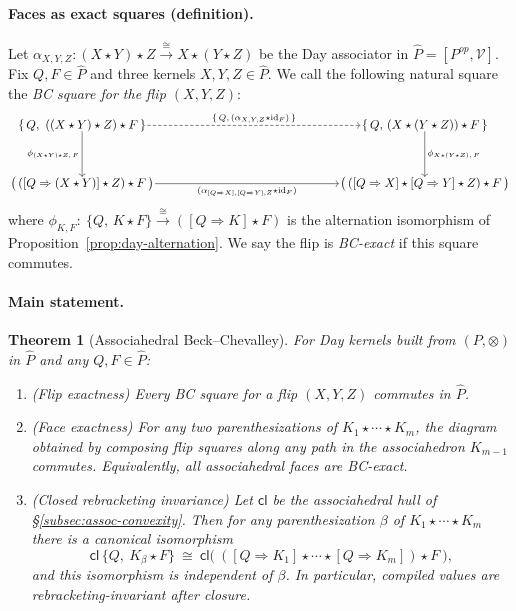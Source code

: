\documentclass[11pt]{article}
\numberwithin{equation}{section}
\theoremstyle{upright}
\newtheorem{theorem}{Theorem}
\newcommand{\V}{\mathcal{V}}
\begin{document}
\paragraph{Faces as exact squares (definition).}
Let $\alpha_{X,Y,Z} : (X\star Y)\star Z \xrightarrow{\ \cong\ } X\star (Y\star Z)$
be the Day associator in $\widehat P=[P^{op},\V]$.
Fix $Q,F\in\widehat P$ and three kernels $X,Y,Z\in\widehat P$.
We call the following natural square the \emph{BC square for the flip $(X,Y,Z)$}:
\[
\begin{tikzcd}[
  column sep=7.6em,
  row sep=3.8em,
  cells={nodes={inner sep=1pt, text height=1.6ex, text depth=.25ex}}
]
\{\,Q,\ ((X\star Y)\star Z)\star F\,\}
  \arrow[rr, "{\scriptsize \{\,Q,\,(\alpha_{X,Y,Z}\star \mathrm{id}_F)\,\}}", dashed]
  \arrow[d,  "{\scriptsize \phi_{(X\star Y)\star Z,\,F}}"']
&&
\{\,Q,\, (X\star (Y\star Z))\star F\,\}
  \arrow[d, "{\scriptsize \phi_{X\star (Y\star Z),\,F}}"]
\\
\bigl(\,([Q\Rightarrow (X\star Y)]\star Z)\star F\,\bigr)
  \arrow[rr, "{\scriptsize (\alpha_{[Q\Rightarrow X],[Q\Rightarrow Y],Z}\star \mathrm{id}_F)}"']
&&
\bigl(\,([Q\Rightarrow X]\star [Q\Rightarrow Y]\star Z)\star F\,\bigr)
\end{tikzcd}
\]
where $\phi_{K,F}:\ \{Q,\,K\star F\}\xrightarrow{\ \cong\ }([Q\Rightarrow K]\star F)$
is the alternation isomorphism of Proposition~\ref{prop:day-alternation}.
We say the flip is \emph{BC-exact} if this square commutes.

\paragraph{Main statement.}
\begin{theorem}[Associahedral Beck--Chevalley]\label{thm:assoc-BC}
For Day kernels built from $(P,\otimes)$ in $\widehat P$ and any $Q,F\in\widehat P$:
\begin{enumerate}[label=(\alph*), itemsep=0.3ex]
\item \emph{(Flip exactness)} Every BC square for a flip $(X,Y,Z)$ commutes in $\widehat P$.
\item \emph{(Face exactness)} For any two parenthesizations of $K_1\star\cdots\star K_m$,
the diagram obtained by composing flip squares along any path in the associahedron $K_{m-1}$
commutes. Equivalently, all associahedral faces are BC-exact.
\item \emph{(Closed rebracketing invariance)} Let $\mathsf{cl}$ be the associahedral hull
of \S\ref{subsec:assoc-convexity}. Then for any parenthesization $\beta$ of $K_1\star\cdots\star K_m$
there is a canonical isomorphism
\[
\mathsf{cl}\,\bigl\{Q,\ K_\beta\star F\bigr\}
\ \cong\
\mathsf{cl}\!\Big(\ ([Q\Rightarrow K_1]\star\cdots\star [Q\Rightarrow K_m])\star F\ \Big),
\]
and this isomorphism is independent of $\beta$. In particular, compiled values are
rebracketing-invariant after closure.
\end{enumerate}
\end{theorem}
\end{document}
